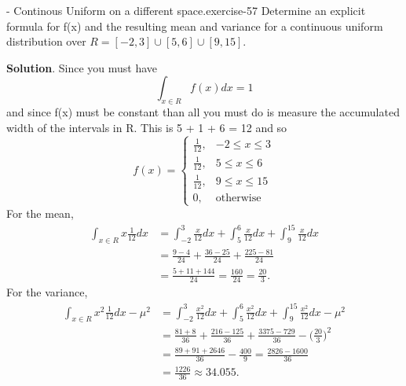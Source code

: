 \documentclass[10pt,]{book}
\numberwithin{equation}{section}
\begin{document}
\begin{inlineexercise}{- Continous Uniform on a different space.}{exercise-57}%
\hypertarget{p-835}{}%
Determine an explicit formula for f(x) and the resulting mean and variance for a continuous uniform distribution over \(R = [-2,3] \cup [5,6] \cup [9,15]\).%
\par\smallskip%
\noindent\textbf{Solution}.\hypertarget{solution-23}{}\quad%
\hypertarget{p-836}{}%
Since you must have%
\begin{equation*}
\int_{x \in R} f(x) dx = 1
\end{equation*}
and since f(x) must be constant than all you must do is measure the accumulated width of the intervals in R. This is 5 + 1 + 6 = 12 and so%
\begin{equation*}
f(x)=\left\{\begin{matrix}
\frac{1}{12}, & -2 \le x \le 3
\\ \frac{1}{12}, & 5 \le x \le 6
\\ \frac{1}{12}, & 9 \le x \le 15
\\ 0, & \text{otherwise}
\end{matrix}\right.
\end{equation*}
For the mean,%
\begin{align*}
\int_{x \in R} x \frac{1}{12} dx & = \int_{-2}^3 \frac{x}{12} dx + \int_5^6 \frac{x}{12} dx + \int_9^{15} \frac{x}{12} dx\\
& = \frac{9-4}{24} + \frac{36-25}{24} + \frac{225-81}{24}\\
& = \frac{5+11+144}{24} = \frac{160}{24} = \frac{20}{3}.
\end{align*}
For the variance,%
\begin{align*}
\int_{x \in R} x^2 \frac{1}{12} dx - \mu^2 & = \int_{-2}^3 \frac{x^2}{12} dx + \int_5^6 \frac{x^2}{12} dx + \int_9^{15} \frac{x^2}{12} dx - \mu^2\\
& = \frac{81+8}{36} + \frac{216-125}{36} + \frac{3375-729}{36} - \big ( \frac{20}{3} \big )^2\\
& = \frac{89+91+2646}{36} - \frac{400}{9} = \frac{2826-1600}{36} \\
& = \frac{1226}{36} \approx	34.055.
\end{align*}
%
\end{inlineexercise}
%
\par
\hypertarget{p-837}{}%
\end{document}
